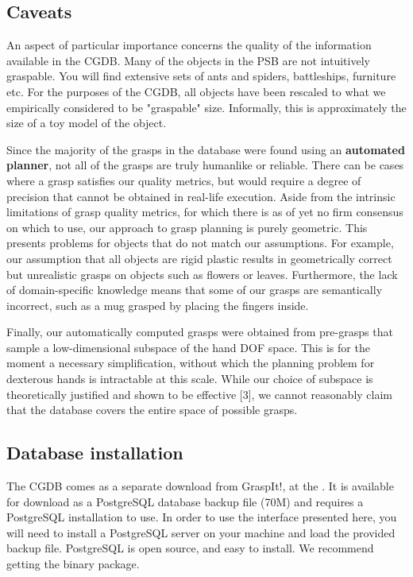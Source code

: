\subsection{Caveats}

An aspect of particular importance concerns the quality of the
information available in the CGDB. Many of the objects in the PSB are
not intuitively graspable. You will find extensive sets of ants and
spiders, battleships, furniture etc. For the purposes of the CGDB, all
objects have been rescaled to what we empirically considered to be
"graspable" size. Informally, this is approximately the size of a toy model
of the object.

Since the majority of the grasps in the database were found using an 
\textbf{automated planner}, not all of the grasps are truly humanlike or
reliable. There can be cases where a grasp satisfies our quality
metrics, but would require a degree of precision that cannot be
obtained in real-life execution. Aside from the intrinsic limitations
of grasp quality metrics, for which there is as of yet no firm
consensus on which to use, our approach to grasp planning is purely
geometric. This presents problems for objects that do not match our
assumptions. For example, our assumption that all objects are rigid
plastic results in geometrically correct but unrealistic grasps on
objects such as flowers or leaves. Furthermore, the lack of
domain-specific knowledge means that some of our grasps are
semantically incorrect, such as a mug grasped by placing the fingers
inside.

Finally, our automatically computed grasps were obtained from pre-grasps that
sample a low-dimensional subspace of the hand DOF space. This is for the moment
a necessary simplification, without which the planning problem for
dexterous hands is intractable at this scale. While our choice of
subspace is theoretically justified and shown to be effective [3], we
cannot reasonably claim that the database covers the entire space of
possible grasps.

\subsection{Database installation}

The CGDB comes as a separate download from GraspIt!, at the
. It is available for
download as a PostgreSQL database backup file (70M) and requires a PostgreSQL
installation to use. In order to use the interface presented here, you
will need to install a PostgreSQL server on your machine and load the
provided backup file. PostgreSQL is open source, and easy to
install. We recommend getting the binary package.

